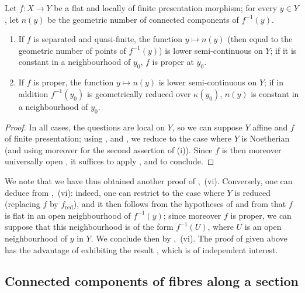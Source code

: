 
\begin{proposition}[15.5.9]
\label{IV.15.5.9}
Let $f:X\to Y$ be a flat and locally of finite presentation morphism; for every $y\in Y$, let $n(y)$ be the geometric number of connected components of $f^{-1}(y)$.
\begin{enumerate}[label=(\roman*)]
  \item If $f$ is separated and quasi-finite, the function $y\mapsto n(y)$ (then equal to the geometric number of points of $f^{-1}(y)$) is lower semi-continuous on $Y$; if it is constant in a neighbourhood of $y_0$, $f$ is proper at $y_0$.
  \item If $f$ is proper, the function $y\mapsto n(y)$ is lower semi-continuous on $Y$; if in addition $f^{-1}(y_0)$ is geometrically reduced over $\kappa(y_0)$, $n(y)$ is constant in a neighbourhood of $y_0$.
\end{enumerate}
\end{proposition}

\begin{proof}
In all cases, the questions are local on $Y$, so we can suppose $Y$ affine and $f$ of finite presentation; using ,  and , we reduce to the case where $Y$ is Noetherian (and using moreover  for the second assertion of (i)).
Since $f$ is then moreover universally open , it suffices to apply ,  and  to conclude.
\end{proof}

\begin{remarks}[15.5.10]
\label{IV.15.5.10}
We note that we have thus obtained another proof of ,~(vi).
Conversely, one can deduce  from ,~(vi): indeed, one can restrict to the case where $Y$ is reduced (replacing $f$ by $f_\mathrm{red}$), and it then follows from the hypotheses of  and from  that $f$ is flat in an open neighbourhood of $f^{-1}(y)$; since moreover $f$ is proper, we can suppose that this neighbourhood is of the form $f^{-1}(U)$, where $U$ is an open neighbourhood of $y$ in $Y$.
We conclude then by ,~(vi).
The proof of  given above has the advantage of exhibiting the result , which is of independent interest.
\end{remarks}


\subsection{Connected components of fibres along a section}
\label{subsection:IV.15.6}

